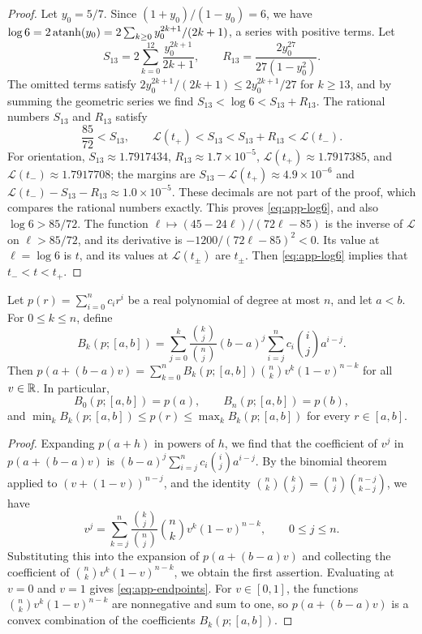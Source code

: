 \begin{proof}
Let $y_0=5/7$. Since $(1+y_0)/(1-y_0)=6$, we have $\log6=2\operatorname{atanh}(y_0)=2\sum_{k\ge0}y_0^{2k+1}/(2k+1)$, a series with positive terms. Let
\[
S_{13}=2\sum_{k=0}^{12}\frac{y_0^{2k+1}}{2k+1},\qquad R_{13}=\frac{2y_0^{27}}{27(1-y_0^2)}.
\]
The omitted terms satisfy $2y_0^{2k+1}/(2k+1)\le2y_0^{2k+1}/27$ for $k\ge13$, and by summing the geometric series we find $S_{13}<\log6<S_{13}+R_{13}$. The rational numbers $S_{13}$ and $R_{13}$ satisfy
\[
\frac{85}{72}<S_{13},\qquad\mathcal L(t_+)<S_{13}<S_{13}+R_{13}<\mathcal L(t_-).
\]
For orientation, $S_{13}\approx1.7917434$, $R_{13}\approx1.7\times10^{-5}$, $\mathcal L(t_+)\approx1.7917385$, and $\mathcal L(t_-)\approx1.7917708$; the margins are $S_{13}-\mathcal L(t_+)\approx4.9\times10^{-6}$ and $\mathcal L(t_-)-S_{13}-R_{13}\approx1.0\times10^{-5}$. These decimals are not part of the proof, which compares the rational numbers exactly. This proves \eqref{eq:app-log6}, and also $\log6>85/72$. The function $\ell\mapsto(45-24\ell)/(72\ell-85)$ is the inverse of $\mathcal L$ on $\ell>85/72$, and its derivative is $-1200/(72\ell-85)^2<0$. Its value at $\ell=\log6$ is $t$, and its values at $\mathcal L(t_\pm)$ are $t_\pm$. Then \eqref{eq:app-log6} implies that $t_-<t<t_+$.
\end{proof}

\begin{lemma}\label{lem:app-bernstein}
Let $p(r)=\sum_{i=0}^nc_ir^i$ be a real polynomial of degree at most $n$, and let $a<b$. For $0\le k\le n$, define
\begin{equation}\label{eq:app-bernstein}
B_k(p;[a,b])=\sum_{j=0}^k\frac{\binom kj}{\binom nj}(b-a)^j\sum_{i=j}^nc_i\binom ija^{i-j}.
\end{equation}
Then $p(a+(b-a)v)=\sum_{k=0}^nB_k(p;[a,b])\binom nkv^k(1-v)^{n-k}$ for all $v\in\mathbb R$. In particular,
\begin{equation}\label{eq:app-endpoints}
B_0(p;[a,b])=p(a),\qquad B_n(p;[a,b])=p(b),
\end{equation}
and $\min_kB_k(p;[a,b])\le p(r)\le\max_kB_k(p;[a,b])$ for every $r\in[a,b]$.
\end{lemma}

\begin{proof}
Expanding $p(a+h)$ in powers of $h$, we find that the coefficient of $v^j$ in $p(a+(b-a)v)$ is $(b-a)^j\sum_{i=j}^nc_i\binom ija^{i-j}$. By the binomial theorem applied to $(v+(1-v))^{n-j}$, and the identity $\binom nk\binom kj=\binom nj\binom{n-j}{k-j}$, we have
\[
v^j=\sum_{k=j}^n\frac{\binom kj}{\binom nj}\binom nkv^k(1-v)^{n-k},\qquad 0\le j\le n.
\]
Substituting this into the expansion of $p(a+(b-a)v)$ and collecting the coefficient of $\binom nkv^k(1-v)^{n-k}$, we obtain the first assertion. Evaluating at $v=0$ and $v=1$ gives \eqref{eq:app-endpoints}. For $v\in[0,1]$, the functions $\binom nkv^k(1-v)^{n-k}$ are nonnegative and sum to one, so $p(a+(b-a)v)$ is a convex combination of the coefficients $B_k(p;[a,b])$.
\end{proof}

